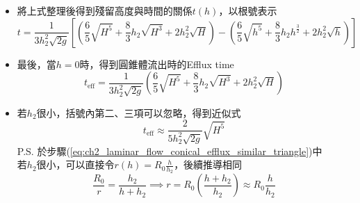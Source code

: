 \documentclass[../main.tex]{subfiles}
\begin{document}
\begin{itemize}
\begin{itemize}
\begin{align}
          \right) - \left(
            \frac{6}{5} h^{\frac{5}{2}} + \frac{8}{3} h_2 h^{\frac{3}{2}} + 2 h_2^2 h^{\frac{1}{2}}
          \right)
        \right]
      \end{align}
    \item 將上式整理後得到殘留高度與時間的關係$t(h)$，以根號表示
      \begin{equation}
        \boxed{t = \frac{1}{3 h_2^2 \sqrt{2g}} \left[
          \left(
            \frac{6}{5} \sqrt{H^5} + \frac{8}{3} h_2 \sqrt{H^3} + 2 h_2^2 \sqrt{H}
          \right) - \left(
            \frac{6}{5} \sqrt{h^5} + \frac{8}{3} h_2 h^{\frac{3}{2}} + 2 h_2^2 \sqrt{h}
          \right)
        \right]}
      \end{equation}
      \item 最後，當$h=0$時，得到圓錐體流出時的Efflux time
      \begin{equation}
        \boxed{t_{\text{eff}} = \frac{1}{3 h_2^2 \sqrt{2g}} \left(
          \frac{6}{5} \sqrt{H^5} + \frac{8}{3} h_2 \sqrt{H^3} + 2 h_2^2 \sqrt{H}
        \right)}
      \end{equation}
      \item 若$h_2$很小，括號內第二、三項可以忽略，得到近似式
      \begin{equation}
        \boxed{t_{\text{eff}} \approx \frac{2}{5 h_2^2 \sqrt{2g}} \sqrt{H^5}}
      \end{equation}
      P.S. 於步驟(\ref{eq:ch2_laminar_flow_conical_efflux_similar_triangle})中\\
      若$h_2$很小，可以直接令$r(h) = R_0 \frac{h}{h_2}$，後續推導相同
      \begin{equation}
      \frac{R_0}{r} = \frac{h_2}{h+h_2} \implies  r = R_0 \left(\frac{h+h_2}{h_2}\right) \approx R_0 \frac{h}{h_2}
    \end{equation}
    \end{itemize}
\end{itemize}
\end{document}
